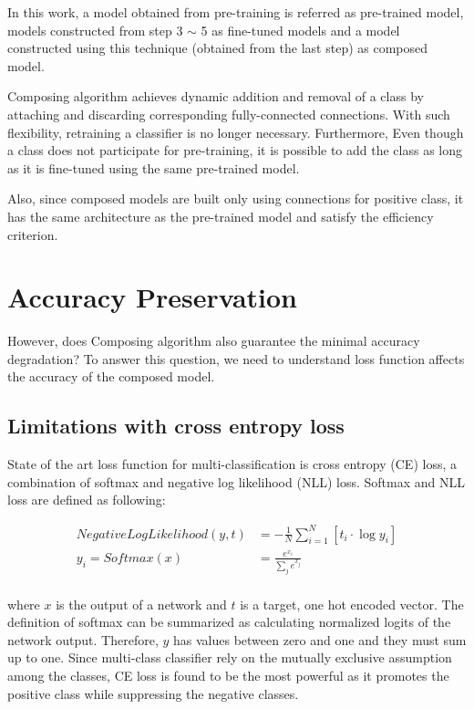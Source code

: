 \documentclass{article}
\begin{document}
In this work, a model obtained from pre-training is referred as pre-trained model, models constructed from step 3 $\sim$ 5 as fine-tuned models and a model constructed using this technique (obtained from the last step) as composed model.

Composing algorithm achieves dynamic addition and removal of a class by attaching and discarding corresponding fully-connected connections. With such flexibility, retraining a classifier is no longer necessary. Furthermore, Even though a class does not participate for pre-training, it is possible to add the class as long as it is fine-tuned using the same pre-trained model.

Also, since composed models are built only using connections for positive class, it has the same architecture as the pre-trained model and satisfy the efficiency criterion.

\section{Accuracy Preservation}

However, does Composing algorithm also guarantee the minimal accuracy degradation? To answer this question, we need to understand loss function affects the accuracy of the composed model.

\subsection{Limitations with cross entropy loss}

State of the art loss function for multi-classification is cross entropy (CE) loss, a combination of softmax and negative log likelihood (NLL) loss. Softmax and NLL loss are defined as following:

\begin{align*}
NegativeLogLikelihood(y, t) & = -\frac{1}{N}\sum_{i=1}^N \left[ t_i \cdot \log y_i\right] \\
y_i = Softmax(x) &= \frac{e^{x_i}}{\sum_{j}e^{x_j}} \\
\end{align*}

where $x$ is the output of a network and $t$ is a target, one hot encoded vector. The definition of softmax can be summarized as calculating normalized logits of the network output. Therefore, $y$ has values between zero and one and they must sum up to one. Since multi-class classifier rely on the mutually exclusive assumption among the classes, CE loss is found to be the most powerful as it promotes the positive class while suppressing the negative classes.
\end{document}
